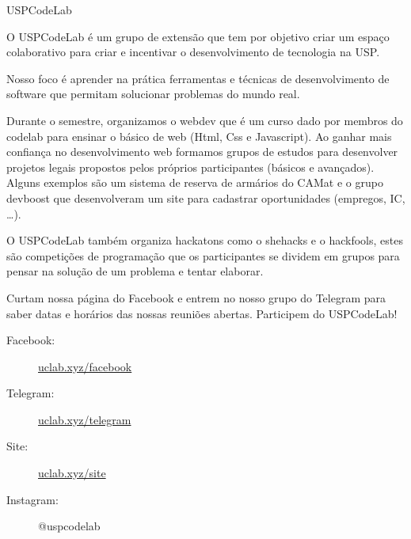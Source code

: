 \begin{subsecao}{USPCodeLab}


O USPCodeLab é um grupo de extensão que tem por objetivo criar um espaço
colaborativo para criar e incentivar o desenvolvimento de tecnologia na USP.

Nosso foco é aprender na prática ferramentas e técnicas de desenvolvimento de software que permitam
solucionar problemas do mundo real.

Durante o semestre, organizamos o webdev que é um curso dado por membros do codelab para ensinar o
básico de web (Html, Css e Javascript). Ao ganhar mais confiança no desenvolvimento web formamos
grupos de estudos para desenvolver projetos legais propostos pelos próprios participantes (básicos
e avançados). Alguns exemplos são um sistema de reserva de armários do CAMat e o grupo devboost que
desenvolveram um site para cadastrar oportunidades (empregos, IC, \dots). 

O USPCodeLab também organiza hackatons como o shehacks e o hackfools, estes são competições de
programação que os participantes se dividem em grupos para pensar na solução de um problema e tentar
elaborar.

Curtam nossa página do Facebook e entrem no nosso grupo do Telegram para saber
datas e horários das nossas reuniões abertas. Participem do USPCodeLab!

\begin{description}
\item[Facebook:] \url{uclab.xyz/facebook}
\item[Telegram:] \url{uclab.xyz/telegram}
\item[Site:] \url{uclab.xyz/site}
\item[Instagram:] @uspcodelab
\end{description}

\end{subsecao}
